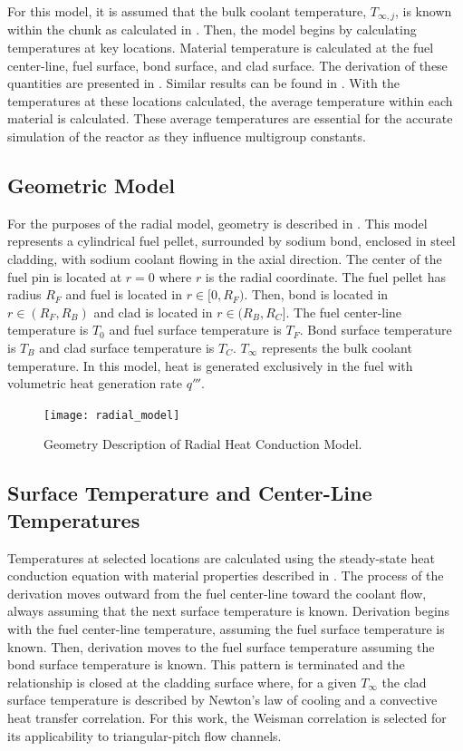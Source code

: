   For this model, it is assumed
  that the bulk coolant temperature, $T_{\infty,j}$, is known within the chunk 
  as calculated in . Then, the model begins by 
  calculating temperatures at key locations. Material temperature is calculated
  at the fuel center-line, fuel surface, bond surface, and clad surface. The
  derivation of these quantities are presented in . 
  Similar results can be found in \cite{FastSpectrumReactors}. With the
  temperatures at these locations calculated, the average temperature within
  each material is calculated. These average temperatures are essential for the
  accurate simulation of the reactor as they influence multigroup constants.

  \subsection{Geometric Model}
    For the purposes of the radial model, geometry is described in
    . This model represents a cylindrical fuel pellet,
    surrounded by sodium bond, enclosed in steel cladding, with sodium coolant
    flowing in the axial direction. The center of the fuel pin is located at
    $r=0$ where $r$ is the radial coordinate. The fuel pellet has radius $R_F$
    and fuel is located in $r \in [0,R_F)$. Then, bond is located in 
    $r \in (R_F,R_B)$ and clad is located in $r \in (R_B,R_C]$. The fuel 
    center-line temperature is $T_0$ and fuel surface temperature is $T_F$. Bond
    surface temperature is $T_B$ and clad surface temperature is 
    $T_C$. $T_{\infty}$ represents the bulk coolant temperature. In this model,
    heat is generated exclusively in the fuel with volumetric heat generation 
    rate $q'''$. 

    \begin{figure}
      \centering
      \texttt{[image: radial\_model]}
      \caption{Geometry Description of Radial Heat Conduction Model.}
      \label{fig:radial_model}
    \end{figure}

  \subsection{Surface Temperature and Center-Line Temperatures}
    \label{sec:surface_temps}
    Temperatures at selected locations are calculated using the steady-state
    heat conduction equation with material properties described in
    . The process of the derivation moves outward
    from the fuel center-line toward the coolant flow, always assuming that the
    next surface temperature is known. Derivation begins with the fuel 
    center-line temperature, assuming the fuel surface temperature is known. 
    Then, derivation moves to the fuel surface temperature assuming the bond 
    surface temperature is known. This pattern is terminated and the 
    relationship is closed at the cladding surface where, for a given 
    $T_{\infty}$ the clad surface temperature is described by Newton's law of 
    cooling and a convective heat transfer correlation. For this work, the 
    Weisman correlation is selected for its applicability to triangular-pitch 
    flow channels.  


